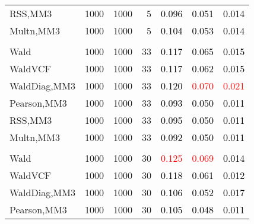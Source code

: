 \documentclass[
]{article}
\begin{document}
\begin{table}[H]
{\begin{tabular}[t]{lrrrrrr}
\hspace{1em}RSS,MM3 & 1000 & 1000 & 5 & \textcolor{black}{0.096} & \textcolor{black}{0.051} & \textcolor{black}{0.014}\\
\hspace{1em}Multn,MM3 & 1000 & 1000 & 5 & \textcolor{black}{0.104} & \textcolor{black}{0.053} & \textcolor{black}{0.014}\\
\addlinespace[0.3em]
\multicolumn{7}{l}{\textbf{1F 15V}}\\
\hspace{1em}Wald & 1000 & 1000 & 33 & \textcolor{black}{0.117} & \textcolor{black}{0.065} & \textcolor{black}{0.015}\\
\hspace{1em}WaldVCF & 1000 & 1000 & 33 & \textcolor{black}{0.117} & \textcolor{black}{0.062} & \textcolor{black}{0.015}\\
\hspace{1em}WaldDiag,MM3 & 1000 & 1000 & 33 & \textcolor{black}{0.120} & \textcolor{red}{0.070} & \textcolor{red}{0.021}\\
\hspace{1em}Pearson,MM3 & 1000 & 1000 & 33 & \textcolor{black}{0.093} & \textcolor{black}{0.050} & \textcolor{black}{0.011}\\
\hspace{1em}RSS,MM3 & 1000 & 1000 & 33 & \textcolor{black}{0.095} & \textcolor{black}{0.050} & \textcolor{black}{0.011}\\
\hspace{1em}Multn,MM3 & 1000 & 1000 & 33 & \textcolor{black}{0.092} & \textcolor{black}{0.050} & \textcolor{black}{0.011}\\
\addlinespace[0.3em]
\multicolumn{7}{l}{\textbf{2F 10V}}\\
\hspace{1em}Wald & 1000 & 1000 & 30 & \textcolor{red}{0.125} & \textcolor{red}{0.069} & \textcolor{black}{0.014}\\
\hspace{1em}WaldVCF & 1000 & 1000 & 30 & \textcolor{black}{0.118} & \textcolor{black}{0.061} & \textcolor{black}{0.012}\\
\hspace{1em}WaldDiag,MM3 & 1000 & 1000 & 30 & \textcolor{black}{0.106} & \textcolor{black}{0.052} & \textcolor{black}{0.017}\\
\hspace{1em}Pearson,MM3 & 1000 & 1000 & 30 & \textcolor{black}{0.105} & \textcolor{black}{0.048} & \textcolor{black}{0.011}\\

\end{tabular}}
\end{table}
\end{document}
